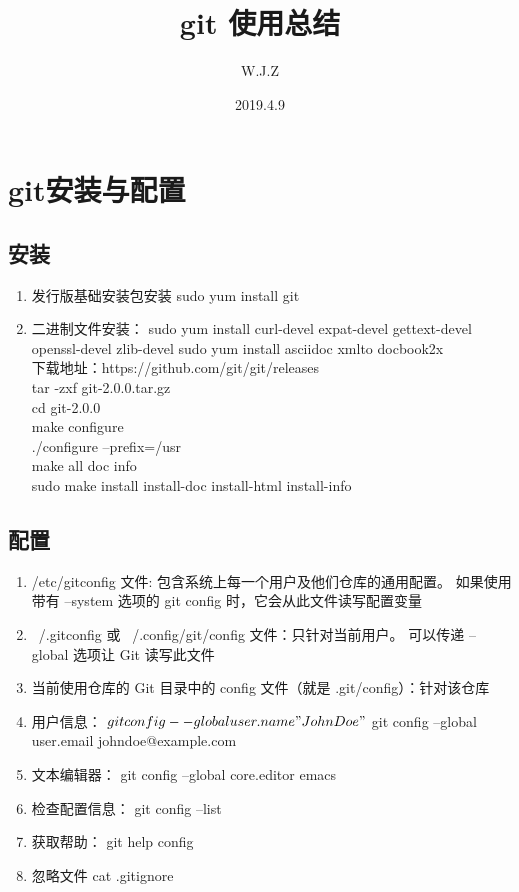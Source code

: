 \documentclass{article}
\title{git 使用总结}
\author{W.J.Z}
\date{2019.4.9}
\begin{document}
	\maketitle
	\section{git安装与配置}
	\subsection{安装}
	\begin{enumerate}
		\item 发行版基础安装包安装 sudo yum install git
		
		\item 二进制文件安装：	sudo yum install curl-devel expat-devel gettext-devel openssl-devel zlib-devel
		sudo yum install asciidoc xmlto docbook2x \\	
		下载地址：https://github.com/git/git/releases\\	
		tar -zxf git-2.0.0.tar.gz\\
		cd git-2.0.0\\
		make configure\\
		./configure --prefix=/usr\\
		make all doc info\\
		sudo make install install-doc install-html install-info
	\end{enumerate}


	\subsection{配置}
	\begin{enumerate}
		\item /etc/gitconfig 文件: 包含系统上每一个用户及他们仓库的通用配置。 如果使用带有 --system 选项的
		git config 时，它会从此文件读写配置变量
		
		\item ~/.gitconfig 或 ~/.config/git/config 文件：只针对当前用户。 可以传递 --global 选项让 Git
		读写此文件
		
		\item 当前使用仓库的 Git 目录中的 config 文件（就是 .git/config）：针对该仓库
		
		\item 用户信息：
		$ git config --global user.name "John Doe"
		$ git config --global user.email johndoe@example.com
		\item 文本编辑器：
		git config --global core.editor emacs
		\item 检查配置信息：
		git config --list
		\item 获取帮助：
		git help config
		
		\item 忽略文件 
		cat .gitignore
	\end{enumerate}
\end{document}
